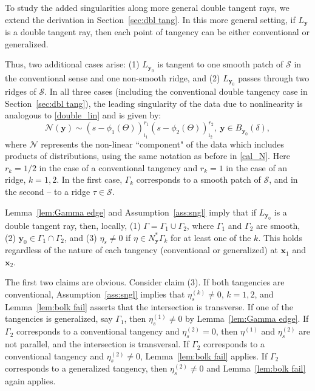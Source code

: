 \documentclass[11pt]{article}
\newcommand{\be}{\begin{equation}}
\newcommand{\ee}{\end{equation}}
\newcommand{\s}{\mathcal S}
\newcommand{\ed}{\tau}
\numberwithin{equation}{section}
\newcommand{\vy}{\mathbf{y}}
\newcommand{\vx}{\mathbf{x}}
\theoremstyle{definition}
\begin{document}
To study the added singularities along more general double tangent rays, we extend the derivation in Section~\ref{sec:dbl tang}. In this more general setting, if $L_{\vy}$ is  a double tangent ray, then each point of tangency can be either conventional or generalized. 

Thus, two additional cases arise: (1) $L_{\vy_0}$ is tangent to one smooth patch of $\s$ in the conventional sense and one non-smooth ridge, and (2) $L_{\vy_0}$ passes through two ridges of $\s$. In all three cases  (including the conventional double tangency case in Section~\ref{sec:dbl tang}), the leading singularity of the data due to nonlinearity is analogous to \eqref{double_lin} and is given by:
\be
\label{double_lin gen}
\mathcal{N}(\vy) \sim (s - \phi_1(\Theta))_{\imath_1}^{r_1}(s - \phi_2(\Theta))_{\imath_2}^{r_2},\ \vy\in B_{\vy_0}(\delta),
\ee
where $\mathcal{N}$ represents the non-linear ``component" of the data which includes products of distributions, using the same notation as before in \eqref{cal_N}. Here $r_k=1/2$ in the case of a conventional tangency and $r_k=1$ in the case of an ridge, $k=1,2$. In the first case, $\Gamma_k$ corresponds to a smooth patch of $\s$, and in the second -- to a {ridge} $\ed\in\s$. 

Lemma~\ref{lem:Gamma edge} and Assumption~\ref{ass:sngl} imply that if $L_{\vy_0}$ is a double tangent ray, then, locally, (1) $\Gamma=\Gamma_1\cup\Gamma_2$, where $\Gamma_1$ and $\Gamma_2$ are smooth, (2) $\vy_0\in\Gamma_1\cap\Gamma_2$, and (3) $\eta_s\not=0$ if $\eta\in N_{\vy}^*\Gamma_k$ for at least one of the $k$. This holds regardless of the nature of each tangency (conventional or generalized) at $\vx_1$ and $\vx_2$. 

The first two claims are obvious. Consider claim (3). If both tangencies are conventional, Assumption~\ref{ass:sngl} implies that $\eta_s^{(k)}\not=0$, $k=1,2$, and Lemma~\ref{lem:bolk fail} asserts that the intersection is transverse. If one of the tangencies is generalized, say $\Gamma_1$, then $\eta_s^{(1)}\not=0$ by Lemma~\ref{lem:Gamma edge}. If $\Gamma_2$ corresponds to a conventional tangency and $\eta_s^{(2)}=0$, then $\eta^{(1)}$ and $\eta_s^{(2)}$ are not parallel, and the intersection is transversal. If $\Gamma_2$ corresponds to a conventional tangency and $\eta_s^{(2)}\not=0$, Lemma~\ref{lem:bolk fail} applies. If $\Gamma_2$ corresponds to a generalized tangency, then $\eta_s^{(2)}\not=0$ and Lemma~\ref{lem:bolk fail} again applies. 
\end{document}
